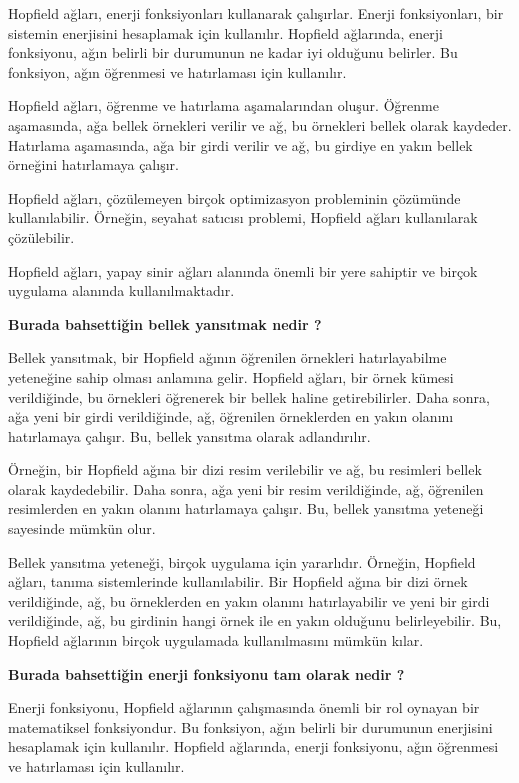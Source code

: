 \documentclass[11pt]{article}
\begin{document}
Hopfield ağları, enerji fonksiyonları kullanarak çalışırlar. Enerji fonksiyonları, bir sistemin enerjisini hesaplamak için kullanılır. Hopfield ağlarında, enerji fonksiyonu, ağın belirli bir durumunun ne kadar iyi olduğunu belirler. Bu fonksiyon, ağın öğrenmesi ve hatırlaması için kullanılır.

Hopfield ağları, öğrenme ve hatırlama aşamalarından oluşur. Öğrenme aşamasında, ağa bellek örnekleri verilir ve ağ, bu örnekleri bellek olarak kaydeder. Hatırlama aşamasında, ağa bir girdi verilir ve ağ, bu girdiye en yakın bellek örneğini hatırlamaya çalışır.

Hopfield ağları, çözülemeyen birçok optimizasyon probleminin çözümünde kullanılabilir. Örneğin, seyahat satıcısı problemi, Hopfield ağları kullanılarak çözülebilir.

Hopfield ağları, yapay sinir ağları alanında önemli bir yere sahiptir ve birçok uygulama alanında kullanılmaktadır.

\textbf{Burada bahsettiğin bellek yansıtmak nedir ?}

Bellek yansıtmak, bir Hopfield ağının öğrenilen örnekleri hatırlayabilme yeteneğine sahip olması anlamına gelir. Hopfield ağları, bir örnek kümesi verildiğinde, bu örnekleri öğrenerek bir bellek haline getirebilirler. Daha sonra, ağa yeni bir girdi verildiğinde, ağ, öğrenilen örneklerden en yakın olanını hatırlamaya çalışır. Bu, bellek yansıtma olarak adlandırılır.

Örneğin, bir Hopfield ağına bir dizi resim verilebilir ve ağ, bu resimleri bellek olarak kaydedebilir. Daha sonra, ağa yeni bir resim verildiğinde, ağ, öğrenilen resimlerden en yakın olanını hatırlamaya çalışır. Bu, bellek yansıtma yeteneği sayesinde mümkün olur.

Bellek yansıtma yeteneği, birçok uygulama için yararlıdır. Örneğin, Hopfield ağları, tanıma sistemlerinde kullanılabilir. Bir Hopfield ağına bir dizi örnek verildiğinde, ağ, bu örneklerden en yakın olanını hatırlayabilir ve yeni bir girdi verildiğinde, ağ, bu girdinin hangi örnek ile en yakın olduğunu belirleyebilir. Bu, Hopfield ağlarının birçok uygulamada kullanılmasını mümkün kılar.

\textbf{Burada bahsettiğin enerji fonksiyonu tam olarak nedir ?}

Enerji fonksiyonu, Hopfield ağlarının çalışmasında önemli bir rol oynayan bir matematiksel fonksiyondur. Bu fonksiyon, ağın belirli bir durumunun enerjisini hesaplamak için kullanılır. Hopfield ağlarında, enerji fonksiyonu, ağın öğrenmesi ve hatırlaması için kullanılır.
\end{document}
